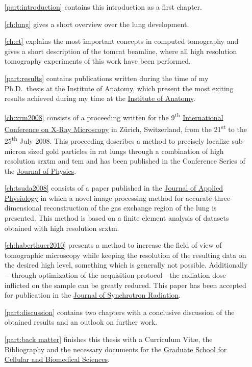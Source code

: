 \begin{itemize}
	\item [\autoref{part:introduction}] contains this introduction as a first chapter.
		
		\autoref{ch:lung} gives a short overview over the lung development.
	
		\autoref{ch:ct} explains the most important concepts in computed tomography and gives a short description of the \ac{tomcat} beamline, where all high resolution tomography experiments of this work have been performed.
	\item [\autoref{part:results}] contains publications written during the time of my Ph.D.\ thesis at the Institute of Anatomy, which present the most exiting results achieved during my time at the \href{http://www.ana.unibe.ch/index_e.jsp}{Institute of Anatomy}.
	
		\autoref{ch:xrm2008} consists of a proceeding written for the 9\textsuperscript{th} \href{http://xrm2008.web.psi.ch/}{International Conference on X-Ray Microscopy} in Zürich, Switzerland, from the 21\textsuperscript{st} to the 25\textsuperscript{th} July 2008. This proceeding describes a method to precisely localize sub-micron sized gold particles in rat lungs through a combination of high resolution \acl{srxtm} and \acl{tem} and has been published in the Conference Series of the \href{http://iopscience.iop.org/1742-6596/}{Journal of Physics}.
		
		\autoref{ch:tsuda2008} consists of a paper published in the \href{http://jap.physiology.org/}{Journal of Applied Physiology} in which a novel image processing method for accurate three-dimensional reconstruction of the gas exchange region of the lung is presented. This method is based on a finite element analysis of datasets obtained with high resolution \acl{srxtm}.

		\autoref{ch:haberthuer2010} presents a method to increase the field of view of tomographic microscopy while keeping the resolution of the resulting data on the desired high level, something which is generally not possible. Additionally---through optimization of the acquisition protocol---the radiation dose inflicted on the sample can be greatly reduced. This paper has been accepted for publication in the \href{http://journals.iucr.org/s/}{Journal of Synchrotron Radiation}.

	\item [\autoref{part:discussion}] contains two chapters with a conclusive discussion of the obtained results and an outlook on further work.
	\item [\autoref{part:back matter}] finishes this thesis with a Curriculum Vit\ae, the Bibliography and the necessary documents for the \href{http://www.gcb.unibe.ch}{Graduate School for Cellular and Biomedical Sciences}.
\end{itemize}


